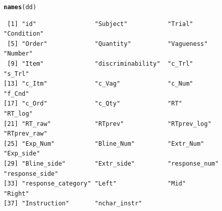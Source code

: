 \documentclass[a4paper,12pt]{article}\usepackage[]{graphicx}\usepackage[]{color}
\makeatletter
\newcommand{\hlstd}[1]{\textcolor[rgb]{0.345,0.345,0.345}{#1}}%
\newcommand{\hlkwd}[1]{\textcolor[rgb]{0.737,0.353,0.396}{\textbf{#1}}}%
\newenvironment{kframe}{%
 \def\at@end@of@kframe{}%
 \ifinner\ifhmode%
  \def\at@end@of@kframe{\end{minipage}}%
  \begin{minipage}{\columnwidth}%
 \fi\fi%
 \def\FrameCommand##1{\hskip\@totalleftmargin \hskip-\fboxsep
 \colorbox{shadecolor}{##1}\hskip-\fboxsep
     \hskip-\linewidth \hskip-\@totalleftmargin \hskip\columnwidth}%
 \MakeFramed {\advance\hsize-\width
   \@totalleftmargin\z@ \linewidth\hsize
   \@setminipage}}%
 {\par\unskip\endMakeFramed%
 \at@end@of@kframe}
\newenvironment{knitrout}{}{} %
\makeatother
\begin{document}
\begin{knitrout}\scriptsize
{}\color{fgcolor}\begin{kframe}
\begin{alltt}
\hlkwd{names}\hlstd{(dd)}
\end{alltt}
\begin{verbatim}
 [1] "id"                "Subject"           "Trial"             "Condition"        
 [5] "Order"             "Quantity"          "Vagueness"         "Number"           
 [9] "Item"              "discriminability"  "c_Trl"             "s_Trl"            
[13] "c_Itm"             "c_Vag"             "c_Num"             "f_Cnd"            
[17] "c_Ord"             "c_Qty"             "RT"                "RT_log"           
[21] "RT_raw"            "RTprev"            "RTprev_log"        "RTprev_raw"       
[25] "Exp_Num"           "Bline_Num"         "Extr_Num"          "Exp_side"         
[29] "Bline_side"        "Extr_side"         "response_num"      "response_side"    
[33] "response_category" "Left"              "Mid"               "Right"            
[37] "Instruction"       "nchar_instr"      
\end{verbatim}
\end{kframe}
\end{knitrout}
\end{document}
